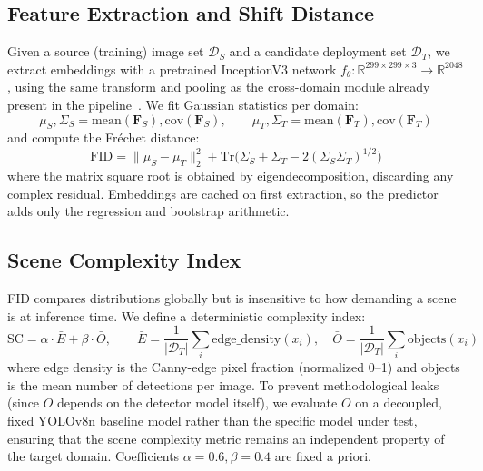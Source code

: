 \documentclass[10pt,twocolumn,letterpaper]{article}
\begin{document}
\subsection{Feature Extraction and Shift Distance}
Given a source (training) image set $\mathcal{D}_S$ and a candidate deployment set $\mathcal{D}_T$, we extract embeddings with a pretrained InceptionV3 network $f_\theta: \mathbb{R}^{299\times299\times3} \to \mathbb{R}^{2048}$, using the same transform and pooling as the cross-domain module already present in the pipeline~\cite{wyoloservice2}. We fit Gaussian statistics per domain:
\begin{equation}
    \mu_S, \Sigma_S = \text{mean}(\mathbf{F}_S), \text{cov}(\mathbf{F}_S), \qquad
    \mu_T, \Sigma_T = \text{mean}(\mathbf{F}_T), \text{cov}(\mathbf{F}_T)
\end{equation}
and compute the Fr\'echet distance:
\begin{equation}
    \text{FID} = \|\mu_S - \mu_T\|_2^2 + \text{Tr}\big(\Sigma_S + \Sigma_T - 2(\Sigma_S\Sigma_T)^{1/2}\big)
\end{equation}
where the matrix square root is obtained by eigendecomposition, discarding any complex residual. Embeddings are cached on first extraction, so the predictor adds only the regression and bootstrap arithmetic.

\subsection{Scene Complexity Index}
FID compares distributions globally but is insensitive to how demanding a scene is at inference time. We define a deterministic complexity index:
\begin{equation}
    \text{SC} = \alpha \cdot \bar{E} + \beta \cdot \bar{O}, \qquad
    \bar{E} = \frac{1}{|\mathcal{D}_T|}\sum_{i} \text{edge\_density}(x_i), \quad
    \bar{O} = \frac{1}{|\mathcal{D}_T|}\sum_{i} \text{objects}(x_i)
\end{equation}
where edge density is the Canny-edge pixel fraction (normalized 0--1) and objects is the mean number of detections per image. To prevent methodological leaks (since $\bar{O}$ depends on the detector model itself), we evaluate $\bar{O}$ on a decoupled, fixed YOLOv8n baseline model rather than the specific model under test, ensuring that the scene complexity metric remains an independent property of the target domain. Coefficients $\alpha=0.6, \beta=0.4$ are fixed a priori.
\end{document}
